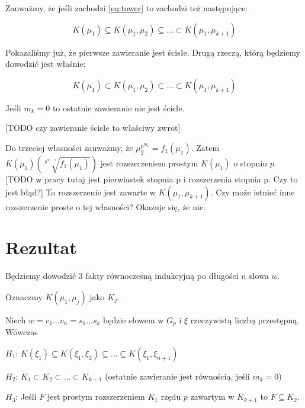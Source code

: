 Zauważmy, że jeśli zachodzi \ref{eq:tower} to zachodzi też następujące:

\[
  K\left(\mu_1\right) \subseteq
  K\left(\mu_1, \mu_2\right) \subseteq
  \ldots \subset
  K\left(\mu_1, \mu_{k+1}\right)
\]

Pokazaliśmy już, że pierwsze zawieranie jest ścisłe. Drugą rzeczą, którą
będziemy dowodzić jest właśnie:

\begin{equation}
  K(\mu_1) \subset
  K(\mu_1, \mu_2) \subset
  \ldots \subset
  K(\mu_1, \mu_{k+1})
  \label{eq:strict_tower}
\end{equation}

Jeśli $m_k = 0$ to ostatnie zawieranie nie jest ścisłe.

[TODO czy zawieranie ścisłe to właściwy zwrot]

Do trzeciej własności zauważmy, że $\mu_2^{p^{m_1}} = f_1\left(\mu_1\right)$.
Zatem $K\left(\mu_1\right)\left(\sqrt[p^{m_1 -
1}]{f_1\left(\mu_1\right)}\right)$ jest rozszerzeniem prostym
$K\left(\mu_1\right)$ o stopniu $p$.
[TODO w pracy tutaj jest pierwiastek stopnia p i rozszerzenia stopnia p. Czy to
jest błąd?]
To rozszerzenie jest zawarte w $K\left(\mu_1, \mu_{k+1}\right)$. Czy może
istnieć inne rozszerzenie proste o tej własności? Okazuje się, że nie.

\section{Rezultat}

Będziemy dowodzić 3 fakty równoczesną indukcyjną po długości $n$ słowa $w$.

Oznaczmy $K\left(\mu_1, \mu_j\right)$ jako $K_j$.

\begin{theorem}
  Niech $w = v_1 \ldots v_n = s_1 \ldots s_k$ będzie słowem w $G_p$ i $\xi$
  rzeczywistą liczbą przestępną. Wówczas

  \begin{description}
    \item{$H_1$:} 
      $K\left(\xi_1\right)\subseteq
      K\left(\xi_1, \xi_2\right)\subseteq
      \ldots \subseteq
      K\left(\xi_1, \xi_{n+1}\right)$
    \item{$H_2$:}
      $K_1 \subset K_2 \subset \ldots \subset K_{k+1}$ (ostatnie zawieranie jest
      równością, jeśli $m_k = 0$)
    \item{$H_3$:}
      Jeśli $F$ jest prostym rozszerzeniem $K_1$ rzędu $p$  zawartym w $K_{k+1}$
      to $F \subseteq K_2$.
  \end{description}
  \label{th:hypothesis_h}
\end{theorem}

